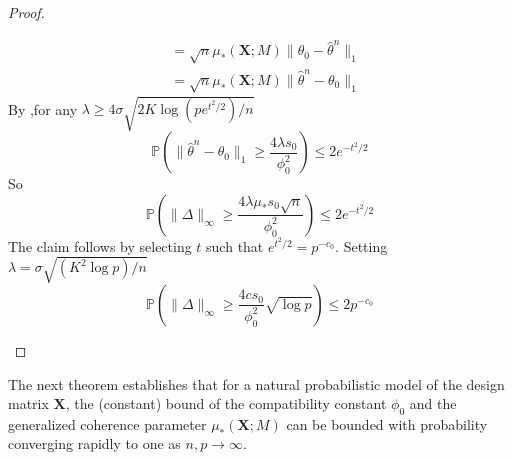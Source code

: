 \documentclass{article}
\begin{document}
\begin{proof}
\begin{enumerate}
\begin{align*}
&= \sqrt{n}\mu_*(\mathbf{X}; M) \|\theta_0 - \hat{\theta}^n\|_1\\
&= \sqrt{n}\mu_*(\mathbf{X}; M) \| \hat{\theta}^n-\theta_0 \|_1
\end{align*}
By \citet[Theorem 6.1, Lemma 6.2]{buhlmann2011statistics},for any $\lambda \ge 4\sigma \sqrt{2K \log(p e^{t^2/2})/n}$ 
\begin{equation}
    \mathbb{P}\left(\|\hat{\theta}^n - \theta_0\|_1 \ge \frac{4 \lambda s_0}{\phi^2_0} \right) \le 2 e^{-t^2/2}
\end{equation}
So 
\begin{equation}
    \mathbb{P}\left(\|\Delta\|_\infty \ge \frac{4 \lambda \mu_* s_0 \sqrt{n}}{\phi^2_0}\right) \le 2 e^{-t^2/2}
\end{equation}
The claim follows by selecting $t$ such that $e^{t^2/2}=p^{-c_0}$. Setting $\lambda = \sigma \sqrt{(K^2\log p)/n}$ 
$$
\mathbb{P}\left(\|\Delta\|_\infty \ge \frac{4c s_0}{\phi_0^2} \sqrt{\log p}\right) \le 2 p^{-c_0}
$$
\end{enumerate}
\end{proof}
\noindent
The next theorem establishes that for a natural probabilistic model of the design matrix $\mathbf{X}$, the (constant) bound of the compatibility constant $\phi_0$ and the generalized coherence parameter $\mu_*(\mathbf{X}; M)$ can be bounded with probability converging rapidly to one as $n, p \to \infty$.
\end{document}
